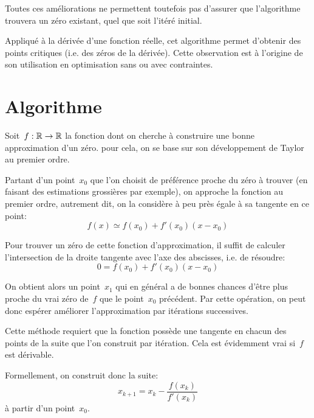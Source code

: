 Toutes ces améliorations ne permettent toutefois pas d'assurer que l'algorithme trouvera un zéro 
existant, quel que soit l'itéré initial.

\medskip
Appliqué à la dérivée d'une fonction réelle, cet algorithme permet d'obtenir des points critiques 
(i.e. des zéros de la dérivée). Cette observation est à l'origine de son utilisation en optimisation 
sans ou avec contraintes.


\medskip
\section{Algorithme}

Soit~$f: \mathbb R\rightarrow\mathbb R$ la fonction dont on cherche à construire une bonne approximation d'un zéro.
pour cela, on se base sur son développement de Taylor au 
premier ordre. 

Partant d'un point~$x_0$ que l'on choisit de préférence proche du zéro à trouver (en faisant des estimations 
grossières par exemple), on approche la fonction au premier ordre, autrement dit, on la considère à peu 
près égale à sa tangente en ce point:
\begin{equation} f(x)\simeq f(x_0) + f'(x_0)(x-x_0) \end{equation}

Pour trouver un zéro de cette fonction d'approximation, il suffit de calculer l'intersection de la droite tangente 
avec l'axe des abscisses, i.e. de résoudre:
\begin{equation} 0=f(x_0) + f'(x_0)(x-x_0) \end{equation}

On obtient alors un point~$x_1$ qui en général a de bonnes chances d'être plus proche du vrai zéro de~$f$ 
que le point~$x_0$ précédent. 
Par cette opération, on peut donc espérer améliorer l'approximation par itérations successives.

Cette méthode requiert que la fonction possède une tangente en chacun des points de la suite que l'on 
construit par itération. Cela est évidemment vrai si~$f$ est dérivable.

\medskip
Formellement, on construit donc la suite:
\begin{equation} x_{k+1} = x_k - \frac{f(x_k)}{f'(x_k)} \end{equation}
à partir d'un point~$x_0$.

